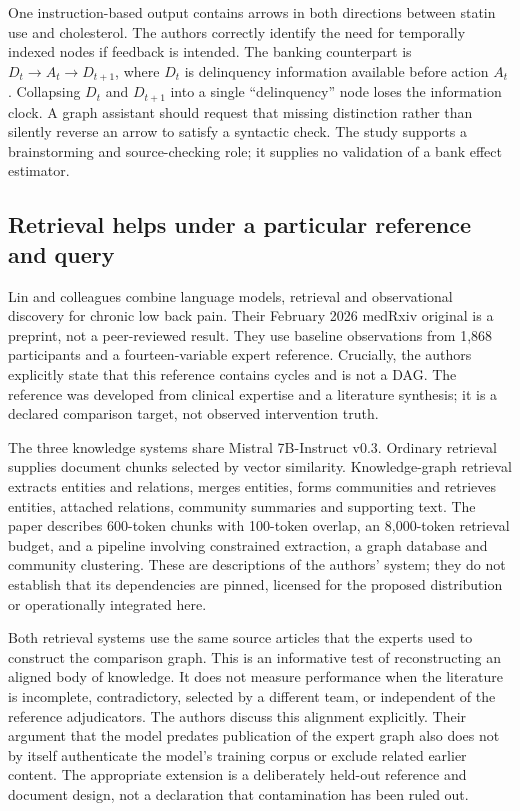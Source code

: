 One instruction-based output contains arrows in both directions between statin
use and cholesterol. The authors correctly identify the need for temporally
indexed nodes if feedback is intended. The banking counterpart is
\(D_t\to A_t\to D_{t+1}\), where \(D_t\) is delinquency information available
before action \(A_t\). Collapsing \(D_t\) and \(D_{t+1}\) into a single
``delinquency'' node loses the information clock. A graph assistant should request
that missing distinction rather than silently reverse an arrow to satisfy a
syntactic check. The study supports a brainstorming and source-checking role;
it supplies no validation of a bank effect estimator.

\subsection{Retrieval helps under a particular reference and query}
\label{exec22:domain-retrieval}

Lin and colleagues combine language models, retrieval and observational discovery
for chronic low back pain. Their February 2026 medRxiv original is a preprint,
not a peer-reviewed result. They use baseline observations from 1,868 participants
and a fourteen-variable expert reference. Crucially, the authors explicitly state
that this reference contains cycles and is not a DAG. The reference was developed
from clinical expertise and a literature synthesis; it is a declared comparison
target, not observed intervention truth. \cite{exec22_domain_lin}

The three knowledge systems share Mistral 7B-Instruct v0.3. Ordinary retrieval
supplies document chunks selected by vector similarity. Knowledge-graph retrieval
extracts entities and relations, merges entities, forms communities and retrieves
entities, attached relations, community summaries and supporting text. The paper
describes 600-token chunks with 100-token overlap, an 8,000-token retrieval budget,
and a pipeline involving constrained extraction, a graph database and community
clustering. These are descriptions of the authors' system; they do not establish
that its dependencies are pinned, licensed for the proposed distribution or
operationally integrated here. \cite{exec22_domain_lin}

Both retrieval systems use the same source articles that the experts used to
construct the comparison graph. This is an informative test of reconstructing
an aligned body of knowledge. It does not measure performance when the literature
is incomplete, contradictory, selected by a different team, or independent of the
reference adjudicators. The authors discuss this alignment explicitly. Their
argument that the model predates publication of the expert graph also does not
by itself authenticate the model's training corpus or exclude related earlier
content. The appropriate extension is a deliberately held-out reference and
document design, not a declaration that contamination has been ruled out.

